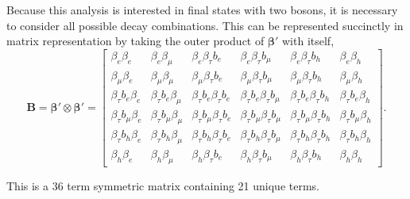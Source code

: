 \noindent
Because this analysis is interested in final states with two \PW bosons,
it is necessary to consider all possible decay combinations.  This can
be represented succinctly in matrix representation by taking the
outer product of $\boldsymbol{\beta'}$ with itself,
% 
\begin{equation}
\label{eq:br_matrix}
    \mathbf{B} =  \boldsymbol{\beta'}\otimes \boldsymbol{\beta'} =
    \begin{bmatrix}
        \beta_e \beta_e     & \beta_e \beta_\mu     & \beta_e \beta_\tau b_{e}     & \beta_e \beta_\tau b_{\mu}   & \beta_e \beta_\tau b_{h}     & \beta_e \beta_h   \\
        \beta_\mu \beta_e   & \beta_\mu \beta_\mu   & \beta_\mu \beta_\tau b_{e}   & \beta_\mu \beta_\tau b_{\mu} & \beta_\mu \beta_\tau b_{h}   & \beta_\mu \beta_h \\
        \beta_\tau b_{e} \beta_e       & \beta_\tau b_{e} \beta_\mu       & \beta_\tau b_{e} \beta_\tau b_{e}       & \beta_\tau b_{e} \beta_\tau b_{\mu}     & \beta_\tau b_{e} \beta_\tau b_{h}       & \beta_\tau b_{e} \beta_h     \\
        \beta_\tau b_{\mu} \beta_e     & \beta_\tau b_{\mu}\beta_\mu      & \beta_\tau b_{\mu} \beta_\tau b_{e}     & \beta_\tau b_{\mu} \beta_\tau b_{\mu}   & \beta_\tau b_{\mu} \beta_\tau b_{h}     & \beta_\tau b_{\mu} \beta_h   \\
        \beta_\tau b_{h} \beta_e       & \beta_\tau b_{h} \beta_\mu       & \beta_\tau b_{h} \beta_\tau b_{e}       & \beta_\tau b_{h}  \beta_\tau b_{\mu}    & \beta_\tau b_{h} \beta_\tau b_{h}       & \beta_\tau b_{h} \beta_h     \\
        \beta_h \beta_e     & \beta_h \beta_\mu     & \beta_h \beta_\tau b_{e}     & \beta_h \beta_\tau b_{\mu}   & \beta_h  \beta_\tau b_{h}    & \beta_h  \beta_h 
	\end{bmatrix}
    . 
\end{equation}


\noindent This is a 36 term symmetric matrix containing 21 unique terms.



